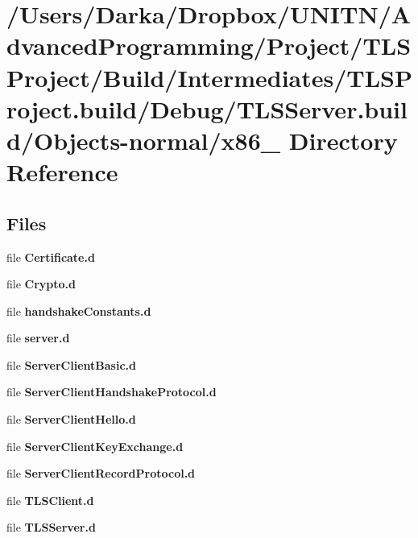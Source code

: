 \section{/\+Users/\+Darka/\+Dropbox/\+U\+N\+I\+T\+N/\+Advanced\+Programming/\+Project/\+T\+L\+S\+Project/\+Build/\+Intermediates/\+T\+L\+S\+Project.build/\+Debug/\+T\+L\+S\+Server.build/\+Objects-\/normal/x86\+\_ Directory Reference}
\label{dir_3d7df78010e9e2329f3be3f95cc348e6}
\subsection*{Files}
\begin{DoxyCompactItemize}
\item 
file {\bf Certificate.\+d}
\item 
file {\bf Crypto.\+d}
\item 
file {\bf handshake\+Constants.\+d}
\item 
file {\bf server.\+d}
\item 
file {\bf Server\+Client\+Basic.\+d}
\item 
file {\bf Server\+Client\+Handshake\+Protocol.\+d}
\item 
file {\bf Server\+Client\+Hello.\+d}
\item 
file {\bf Server\+Client\+Key\+Exchange.\+d}
\item 
file {\bf Server\+Client\+Record\+Protocol.\+d}
\item 
file {\bf T\+L\+S\+Client.\+d}
\item 
file {\bf T\+L\+S\+Server.\+d}
\end{DoxyCompactItemize}
